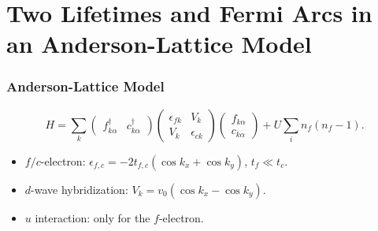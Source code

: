 \documentclass[xcolor=table, 10pt, aspectratio=169]{beamer}
\begin{document}
\section{Two Lifetimes and Fermi Arcs in an Anderson-Lattice Model}

\begin{frame}
\frametitle{Anderson-Lattice Model}
\[H=\sum_k\begin{pmatrix}f_{k\alpha}^\dagger&c_{k\alpha}^\dagger\end{pmatrix}
\begin{pmatrix}\epsilon_{fk} & V_k\\ V_k & \epsilon_{ck}\end{pmatrix}
\begin{pmatrix}f_{k\alpha}\\c_{k\alpha}\end{pmatrix}
+U\sum_in_f(n_f-1).\]
\begin{itemize}
\item $f/c$-electron: $\epsilon_{f,c}=-2t_{f,c}(\cos k_x+\cos k_y)$, $t_f\ll t_c$.
\item $d$-wave hybridization: $V_k=v_0(\cos k_x-\cos k_y)$.
\item $u$ interaction: only for the $f$-electron.
\end{itemize}
\end{frame}
\end{document}
